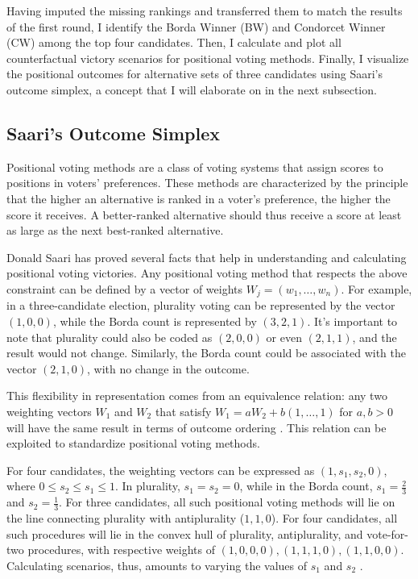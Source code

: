 \documentclass[hidelinks,11pt]{article} \usepackage[utf8]{inputenc}
\begin{document}
Having imputed the missing rankings and transferred them to match the results of
the first round, I identify the Borda Winner (BW) and Condorcet Winner (CW)
among the top four candidates. Then, I calculate and plot all counterfactual
victory scenarios for positional voting methods. Finally, I visualize the
positional outcomes for alternative sets of three candidates using Saari's
outcome simplex, a concept that I will elaborate on in the next subsection.

\subsection{Saari's Outcome Simplex}

Positional voting methods are a class of voting systems that assign scores to
positions in voters' preferences. These methods are characterized by the
principle that the higher an alternative is ranked in a voter's preference, the
higher the score it receives. A better-ranked alternative should thus receive a
score at least as large as the next best-ranked alternative.

Donald Saari has proved several facts that help in understanding and calculating
positional voting victories. Any positional voting method that respects the
above constraint can be defined by a vector of weights
\(W_{j} = (w_{1}, \ldots, w_{n})\). For example, in a three-candidate election,
plurality voting can be represented by the vector \((1,0,0)\), while the Borda
count is represented by \((3,2,1)\). It's important to note that plurality could
also be coded as \((2,0,0)\) or even \((2,1,1)\), and the result would not
change. Similarly, the Borda count could be associated with the vector
\((2,1,0)\), with no change in the outcome.

This flexibility in representation comes from an equivalence relation: any two
weighting vectors \(W_{1}\) and \(W_{2}\) that satisfy
\(W_{1} = aW_{2} + b(1,\ldots, 1)\) for \(a,b > 0\) will have the same result in
terms of outcome ordering \parencite{saari1995basic}. This relation can be
exploited to standardize positional voting methods.

For four candidates, the weighting vectors can be expressed as
\((1,s_{1},s_{2},0)\), where \(0 \leq s_{2} \leq s_{1} \leq 1\). In plurality,
\(s_{1} = s_{2} = 0\), while in the Borda count, \(s_{1} = \frac{2}{3}\) and
\(s_{2} = \frac{1}{3}\). For three candidates, all such positional voting
methods will lie on the line connecting plurality with antiplurality
(\(1,1,0\)). For four candidates, all such procedures will lie in the convex
hull of plurality, antiplurality, and vote-for-two procedures, with respective
weights of \((1,0,0,0), (1,1,1,0), (1,1,0,0)\). Calculating scenarios, thus,
amounts to varying the values of \(s_{1}\) and \(s_{2}\)
\parencite{saari1995basic, saari2001chaotic}.
\end{document}
